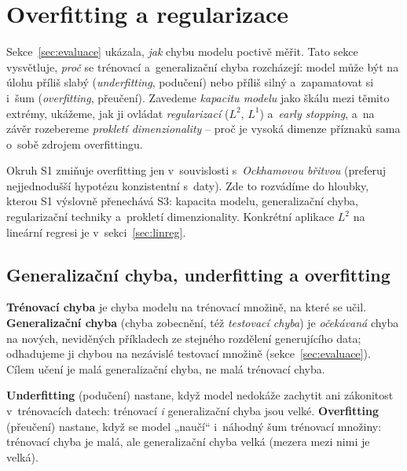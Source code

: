 \section{Overfitting a regularizace}\label{sec:preuceni}

Sekce~\ref{sec:evaluace} ukázala, \emph{jak} chybu modelu poctivě měřit. Tato sekce vysvětluje, \emph{proč} se trénovací a~generalizační chyba rozcházejí: model může být na úlohu příliš slabý (\emph{underfitting}, podučení) nebo příliš silný a~zapamatovat si i~šum (\emph{overfitting}, přeučení). Zavedeme \emph{kapacitu modelu} jako škálu mezi těmito extrémy, ukážeme, jak ji ovládat \emph{regularizací} ($L^2$, $L^1$) a~\emph{early stopping}, a~na závěr rozebereme \emph{prokletí dimenzionality} -- proč je vysoká dimenze příznaků sama o~sobě zdrojem overfittingu.

\begin{poznamka}[Vztah k~S1]
Okruh S1 zmiňuje overfitting jen v~souvislosti s~\emph{Ockhamovou břitvou} (preferuj nejjednodušší hypotézu konzistentní s~daty). Zde to rozvádíme do hloubky, kterou S1 výslovně přenechává S3: kapacita modelu, generalizační chyba, regularizační techniky a~prokletí dimenzionality. Konkrétní aplikace $L^2$ na lineární regresi je v~sekci~\ref{sec:linreg}.
\end{poznamka}

\subsection{Generalizační chyba, underfitting a overfitting}

\begin{definice}
\textbf{Trénovací chyba} je chyba modelu na trénovací množině, na které se učil. \textbf{Generalizační chyba} (chyba zobecnění, též \emph{testovací chyba}) je \emph{očekávaná} chyba na nových, neviděných příkladech ze stejného rozdělení generujícího data; odhadujeme ji chybou na nezávislé testovací množině (sekce~\ref{sec:evaluace}). Cílem učení je malá generalizační chyba, ne malá trénovací chyba.
\end{definice}

\begin{definice}
\textbf{Underfitting} (podučení) nastane, když model nedokáže zachytit ani zákonitost v~trénovacích datech: trénovací \emph{i} generalizační chyba jsou velké. \textbf{Overfitting} (přeučení) nastane, když se model „naučí`` i~náhodný šum trénovací množiny: trénovací chyba je malá, ale generalizační chyba velká (mezera mezi nimi je velká).
\end{definice}


